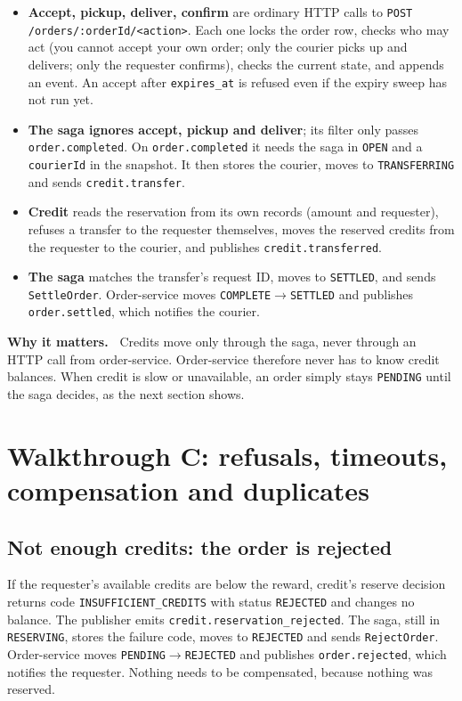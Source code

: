 \documentclass[11pt,a4paper]{article}
\newcommand{\code}[1]{\nolinkurl{#1}}
\newenvironment{why}{%
  \def\FrameCommand{{\color{accent}\vrule width 2.5pt}\hspace{8pt}}%
  \MakeFramed{\advance\hsize-\width\FrameRestore}\noindent\textbf{Why it matters.\ }}%
  {\endMakeFramed}
\begin{document}
\begin{itemize}
  \item \textbf{Accept, pickup, deliver, confirm} are ordinary HTTP calls to
  \code{POST /orders/:orderId/<action>}. Each one locks the order row, checks who may
  act (you cannot accept your own order; only the courier picks up and delivers; only
  the requester confirms), checks the current state, and appends an event. An accept
  after \code{expires_at} is refused even if the expiry sweep has not run yet.
  \item \textbf{The saga ignores accept, pickup and deliver}; its filter only passes
  \code{order.completed}. On \code{order.completed} it needs the saga in \code{OPEN} and a
  \code{courierId} in the snapshot. It then stores the courier, moves to
  \code{TRANSFERRING} and sends \code{credit.transfer}.
  \item \textbf{Credit} reads the reservation from its own records (amount and
  requester), refuses a transfer to the requester themselves, moves the reserved credits
  from the requester to the courier, and publishes \code{credit.transferred}.
  \item \textbf{The saga} matches the transfer's request ID, moves to \code{SETTLED}, and
  sends \code{SettleOrder}. Order-service moves \code{COMPLETE}$\rightarrow$\code{SETTLED}
  and publishes \code{order.settled}, which notifies the courier.
\end{itemize}

\begin{why}
Credits move only through the saga, never through an HTTP call from order-service.
Order-service therefore never has to know credit balances. When credit is slow or
unavailable, an order simply stays \code{PENDING} until the saga decides, as the next
section shows.
\end{why}

\section{Walkthrough C: refusals, timeouts, compensation and duplicates}
\label{sec:failure}

\subsection{Not enough credits: the order is rejected}

If the requester's available credits are below the reward, credit's reserve decision
returns code \code{INSUFFICIENT_CREDITS} with status \code{REJECTED} and changes no
balance. The publisher emits \code{credit.reservation_rejected}. The saga, still in
\code{RESERVING}, stores the failure code, moves to \code{REJECTED} and sends
\code{RejectOrder}. Order-service moves \code{PENDING}$\rightarrow$\code{REJECTED} and
publishes \code{order.rejected}, which notifies the requester. Nothing needs to be
compensated, because nothing was reserved.
\end{document}
